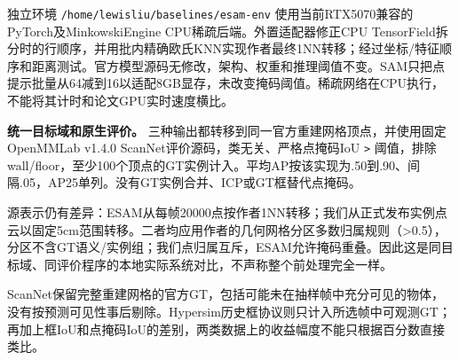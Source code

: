 \documentclass[UTF8,fontset=fandol]{ctexart}
\begin{document}
独立环境 \texttt{/\allowbreak{}home/\allowbreak{}lewisliu/\allowbreak{}baselines/\allowbreak{}esam-env} 使用当前RTX5070兼容的PyTorch及MinkowskiEngine CPU稀疏后端。外置适配器修正CPU TensorField拆分时的行顺序，并用批内精确欧氏KNN实现作者最终1NN转移；经过坐标/特征顺序和距离测试。官方模型源码无修改，架构、权重和推理阈值不变。SAM只把点提示批量从64减到16以适配8GB显存，未改变掩码阈值。稀疏网络在CPU执行，不能将其计时和论文GPU实时速度横比。



\textbf{统一目标域和原生评价。} 三种输出都转移到同一官方重建网格顶点，并使用固定OpenMMLab v1.4.0 ScanNet评价源码，类无关、严格点掩码IoU \texttt{>} 阈值，排除wall/floor，至少100个顶点的GT实例计入。平均AP按该实现为.50到.90、间隔.05，AP25单列。没有GT实例合并、ICP或GT框替代点掩码。



源表示仍有差异：ESAM从每帧20000点按作者1NN转移；我们从正式发布实例点云以固定5cm范围转移。二者均应用作者的几何网格分区多数归属规则（>0.5），分区不含GT语义/实例组；我们点归属互斥，ESAM允许掩码重叠。因此这是同目标域、同评价程序的本地实际系统对比，不声称整个前处理完全一样。



ScanNet保留完整重建网格的官方GT，包括可能未在抽样帧中充分可见的物体，没有按预测可见性事后剔除。Hypersim历史框协议则只计入所选帧中可观测GT；再加上框IoU和点掩码IoU的差别，两类数据上的收益幅度不能只根据百分数直接类比。
\end{document}

